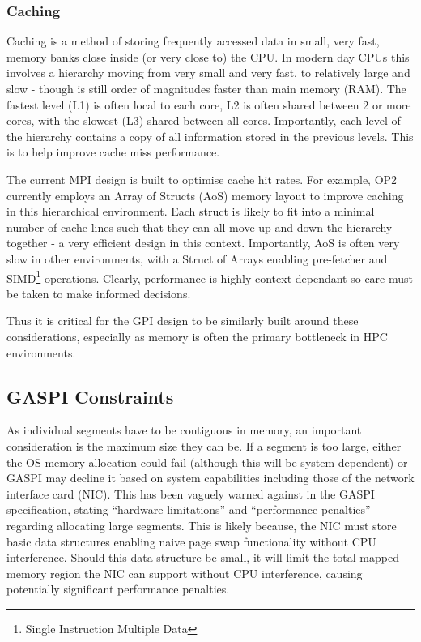 \subsubsection{Caching}

Caching is a method of storing frequently accessed data in small, very fast, memory banks close inside (or very close to) the CPU. In modern day CPUs this involves a hierarchy moving from very small and very fast, to relatively large and slow - though is still order of magnitudes faster than main memory (RAM). The fastest level (L1) is often local to each core, L2 is often shared between 2 or more cores, with the slowest (L3) shared between all cores. Importantly, each level of the hierarchy contains a copy of all information stored in the previous levels. This is to help improve cache miss performance.

The current MPI design is built to optimise cache hit rates. For example, OP2 currently employs an Array of Structs (AoS) memory layout to improve caching in this hierarchical environment. Each struct is likely to fit into a minimal number of cache lines such that they can all move up and down the hierarchy together - a very efficient design in this context.  Importantly, AoS is often very slow in other environments, with a Struct of Arrays enabling pre-fetcher and SIMD\footnote{Single Instruction Multiple Data} operations. Clearly, performance is highly context dependant so care must be taken to make informed decisions.

Thus it is critical for the GPI design to be similarly built around these considerations, especially as memory is often the primary bottleneck in HPC environments. 

\subsection{GASPI Constraints}

As individual segments have to be contiguous in memory, an important consideration is the maximum size they can be. If a segment is too large, either the OS memory allocation could fail (although this will be system dependent) or GASPI may decline it based on system capabilities including those of the network interface card (NIC). This has been vaguely warned against in the GASPI specification, stating ``hardware limitations'' and ``performance penalties'' regarding allocating large segments.  This is likely because, the NIC must store basic data structures enabling naive page swap functionality without CPU interference. Should this data structure be small, it will limit the total mapped memory region the NIC can support without CPU interference, causing potentially significant performance penalties. 

